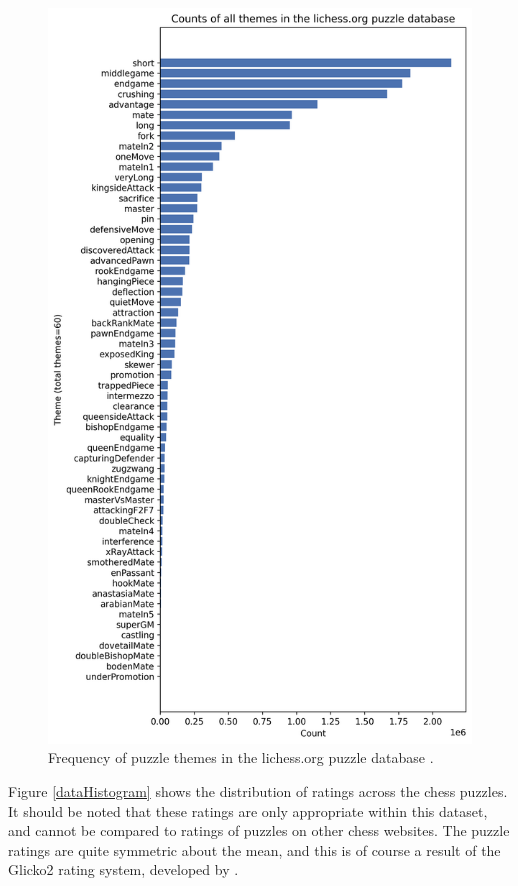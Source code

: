 \begin{figure}
    \centering
    \includegraphics[width=0.9\linewidth]{project/img/puzzle_theme_counts.png}
    \caption{Frequency of puzzle themes in the lichess.org puzzle
    database \citep{lichessPuzzles}.}
    \label{dataThemeCounts}
\end{figure}

Figure \ref{dataHistogram} shows the distribution of ratings across the chess
puzzles. It should be noted that these ratings are only appropriate within this
dataset, and cannot be compared to ratings of puzzles on other chess websites.
The puzzle ratings are quite symmetric about the mean, and this is of course a
result of the Glicko2 rating system, developed by \citet{glicko}.

